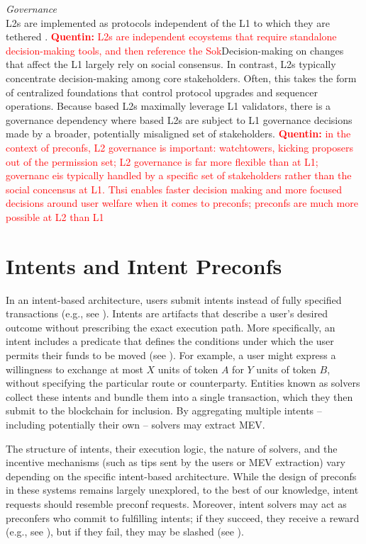 \documentclass[a4paper]{article}
\theoremstyle{boldstyle}
\newcommand{\qb}[1]{\textcolor{red}{\textbf{Quentin:} #1}}
\begin{document}

    \textit{Governance} \\
    L2s are implemented as protocols independent of the L1 to which they are tethered \cite{SoK_L2s}. \qb{L2s are independent ecoystems that require standalone decision-making tools, and then reference the Sok}Decision-making on changes that affect the L1 largely rely on social consensus. In contrast, L2s typically concentrate decision-making among core stakeholders. Often, this takes the form of centralized foundations that control protocol upgrades and sequencer operations. 
    Because based L2s maximally leverage L1 validators, there is a governance dependency where based L2s are subject to L1 governance decisions made by a broader, potentially misaligned set of stakeholders. 
    \qb{in the context of preconfs, L2 governance is important: watchtowers, kicking proposers out of the permission set; L2 governance is far more flexible than at L1; governanc eis typically handled by a specific set of stakeholders rather than the social concensus at L1. Thsi enables faster decision making and more focused decisions around user welfare when it comes to preconfs; preconfs are much more possible at L2 than L1}

   \fi 
   \appendix
    \section{Intents and Intent Preconfs}
    \label{Appendix_A}
    In an intent-based architecture, users submit intents instead of fully specified transactions (e.g., see \cite{W:Intent-BasedArchitectureandTheirRisks, ERC-7521}). Intents are artifacts that describe a user's desired outcome without prescribing the exact execution path. More specifically, an intent includes a predicate that defines the conditions under which the user permits their funds to be moved (see \cite{Anoma}). For example, a user might express a willingness to exchange at most $X$ units of token $A$ for $Y$ units of token $B$, without specifying the particular route or counterparty. Entities known as solvers collect these intents and bundle them into a single transaction, which they then submit to the blockchain for inclusion. By aggregating multiple intents -- including potentially their own -- solvers may extract MEV. \par 
    The structure of intents, their execution logic, the nature of solvers, and the incentive mechanisms (such as tips sent by the users or MEV extraction) vary depending on the specific intent-based architecture. While the design of preconfs in these systems remains largely unexplored, to the best of our knowledge, intent requests should resemble preconf requests. Moreover, intent solvers may act as preconfers who commit to fulfilling intents; if they succeed, they receive a reward (e.g., see \cite{cow_intent}), but if they fail, they may be slashed (see \cite{slash_solver}).
\end{document}
